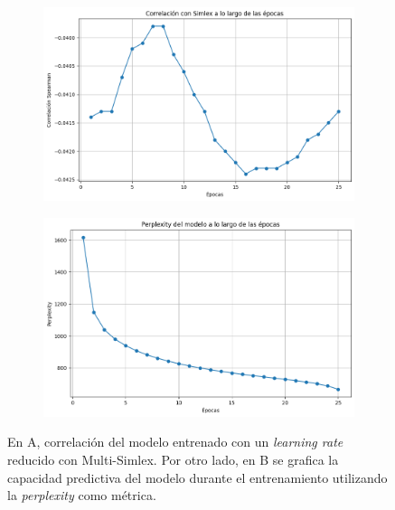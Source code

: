 \begin{figure}[H]
    \centering
    \begin{subfigure}[b]{0.8\textwidth}
        \centering
        \includegraphics[width=1\textwidth]{imagenes/simlex_corr_lrreducido.png}
        \caption{}
        \label{fig:simlex_corr_lrreducido.png}
    \end{subfigure}
    \hfill
    \begin{subfigure}[b]{0.8\textwidth}
        \centering
        \includegraphics[width=1\textwidth]{imagenes/perp_lrreducido.png}
        \caption{}
        \label{fig:perp_lrreducido.png}
    \end{subfigure}
    \caption{En A, correlación del modelo entrenado con un \textit{learning rate} reducido con 
    Multi-Simlex. Por otro lado, en B se grafica la capacidad predictiva del modelo 
    durante el entrenamiento utilizando la \textit{perplexity} como métrica.}
    \label{fig:lrreducido}
\end{figure}

